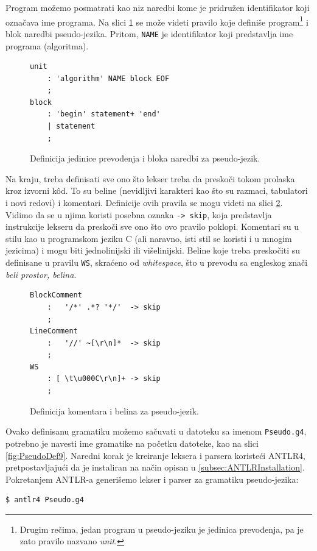 Program možemo posmatrati kao niz naredbi kome je pridružen identifikator koji označava ime programa. Na slici \ref{fig:PseudoDef1} se može videti pravilo koje definiše program\footnote{Drugim rečima, jedan program u pseudo-jeziku je jedinica prevođenja, pa je zato pravilo nazvano \emph{unit}.} i blok naredbi pseudo-jezika. Pritom, \texttt{NAME} je identifikator koji predstavlja ime programa (algoritma).

\begin{figure}[h!]
\begin{lstlisting}[language={}]
unit
    : 'algorithm' NAME block EOF
    ;
block
    : 'begin' statement+ 'end'
    | statement
    ;
\end{lstlisting}
\caption{Definicija jedinice prevođenja i bloka naredbi za pseudo-jezik.}
\label{fig:PseudoDef1}
\end{figure}

Na kraju, treba definisati sve ono što lekser treba da preskoči tokom prolaska kroz izvorni k\^od. To su beline (nevidljivi karakteri kao što su razmaci, tabulatori i novi redovi) i komentari. Definicije ovih pravila se mogu videti na slici \ref{fig:PseudoDef8}. Vidimo da se u njima koristi posebna oznaka \texttt{-> skip}, koja predstavlja instrukcije lekseru da preskoči sve ono što ovo pravilo poklopi. Komentari su u stilu kao u programskom jeziku C (ali naravno, isti stil se koristi i u mnogim jezicima) i mogu biti jednolinijski ili višelinijski. Beline koje treba preskočiti su definisane u pravilu \texttt{WS}, skraćeno od \emph{whitespace}, što u prevodu sa engleskog znači \emph{beli prostor, belina}.

\begin{figure}[h!]
\begin{lstlisting}[language={}]
BlockComment
    :   '/*' .*? '*/'  -> skip
    ;
LineComment
    :   '//' ~[\r\n]*  -> skip
    ;
WS  
    : [ \t\u000C\r\n]+ -> skip
    ;
\end{lstlisting}
\caption{Definicija komentara i belina za pseudo-jezik.}
\label{fig:PseudoDef8}
\end{figure}

Ovako definisanu gramatiku možemo sačuvati u datoteku sa imenom \texttt{Pseudo.g4}, potrebno je navesti ime gramatike na početku datoteke, kao na slici \ref{fig:PseudoDef9}. Naredni korak je kreiranje leksera i parsera koristeći ANTLR4, pretpostavljajući da je instaliran na način opisan u \ref{subsec:ANTLRInstallation}. Pokretanjem ANTLR-a generišemo lekser i parser za gramatiku pseudo-jezika:
\begin{lstlisting}[language={}]
$ antlr4 Pseudo.g4
\end{lstlisting}

